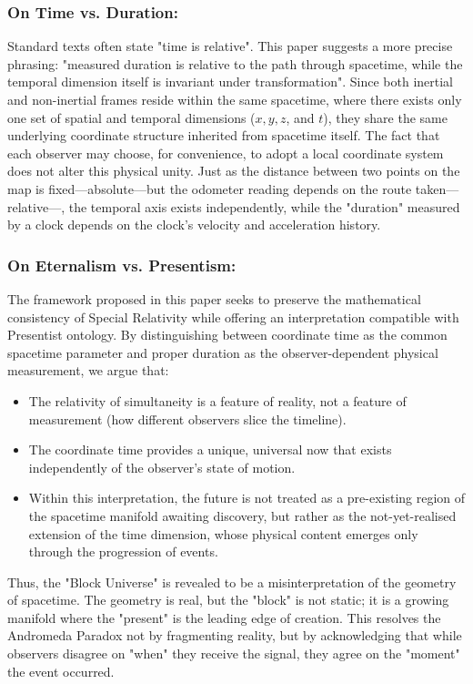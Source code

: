\documentclass[a4paper,fleqn]{cas-sc}
\begin{document}
	\subsubsection{On Time vs. Duration:}\label{subsubsec5_2_2}
	Standard texts often state "time is relative". This paper suggests a more precise phrasing: "measured duration is relative to the path through spacetime, while the temporal dimension itself is invariant under transformation". Since both inertial and non-inertial frames reside within the same spacetime, where there exists only one set of spatial and temporal dimensions ($x, y, z$, and $t$), they share the same underlying coordinate structure inherited from spacetime itself. The fact that each observer may choose, for convenience, to adopt a local coordinate system does not alter this physical unity. Just as the distance between two points on the map is fixed—absolute—but the odometer reading depends on the route taken—relative—, the temporal axis exists independently, while the "duration" measured by a clock depends on the clock's velocity and acceleration history.
	\subsubsection{On Eternalism vs. Presentism:}\label{subsubsec5_2_3}
	The framework proposed in this paper seeks to preserve the mathematical consistency of Special Relativity while offering an interpretation compatible with Presentist ontology. By distinguishing between coordinate time as the common spacetime parameter and proper duration as the observer-dependent physical measurement, we argue that:
		\begin{itemize}
			\item The relativity of simultaneity is a feature of reality, not a feature of measurement (how different observers slice the timeline).
			\item The coordinate time provides a unique, universal now that exists independently of the observer's state of motion.
			\item Within this interpretation, the future is not treated as a pre-existing region of the spacetime manifold awaiting discovery, but rather as the not-yet-realised extension of the time dimension, whose physical content emerges only through the progression of events.
 		\end{itemize}
	Thus, the "Block Universe" is revealed to be a misinterpretation of the geometry of spacetime. The geometry is real, but the "block" is not static; it is a growing manifold where the "present" is the leading edge of creation. This resolves the Andromeda Paradox not by fragmenting reality, but by acknowledging that while observers disagree on "when" they receive the signal, they agree on the "moment" the event occurred.
\end{document}
